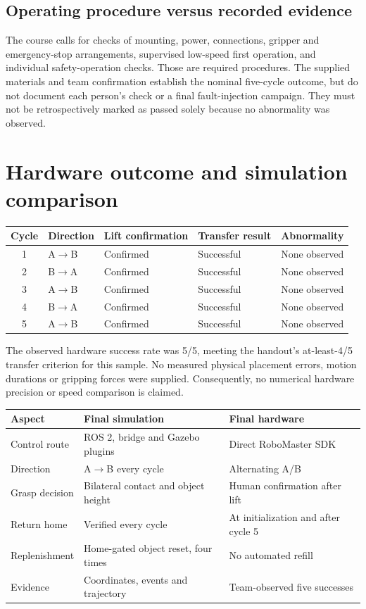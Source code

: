 \subsection{Operating procedure versus recorded evidence}
The course calls for checks of mounting, power, connections, gripper and emergency-stop arrangements, supervised low-speed first operation, and individual safety-operation checks. Those are required procedures. The supplied materials and team confirmation establish the nominal five-cycle outcome, but do not document each person's check or a final fault-injection campaign. They must not be retrospectively marked as passed solely because no abnormality was observed.
\clearpage
\section{Hardware outcome and simulation comparison}
\begin{center}
\begin{tabular}{@{}cllll@{}}\toprule
Cycle & Direction & Lift confirmation & Transfer result & Abnormality\\\midrule
1 & A$\rightarrow$B & Confirmed & Successful & None observed\\
2 & B$\rightarrow$A & Confirmed & Successful & None observed\\
3 & A$\rightarrow$B & Confirmed & Successful & None observed\\
4 & B$\rightarrow$A & Confirmed & Successful & None observed\\
5 & A$\rightarrow$B & Confirmed & Successful & None observed\\\bottomrule
\end{tabular}
\end{center}
The observed hardware success rate was 5/5, meeting the handout's at-least-4/5 transfer criterion for this sample. No measured physical placement errors, motion durations or gripping forces were supplied. Consequently, no numerical hardware precision or speed comparison is claimed.
\begin{center}\small
\begin{tabularx}{\linewidth}{@{}p{30mm}YY@{}}\toprule
Aspect & Final simulation & Final hardware\\\midrule
Control route & ROS 2, bridge and Gazebo plugins & Direct RoboMaster SDK\\
Direction & A$\rightarrow$B every cycle & Alternating A/B\\
Grasp decision & Bilateral contact and object height & Human confirmation after lift\\
Return home & Verified every cycle & At initialization and after cycle 5\\
Replenishment & Home-gated object reset, four times & No automated refill\\
Evidence & Coordinates, events and trajectory & Team-observed five successes\\\bottomrule
\end{tabularx}
\end{center}
